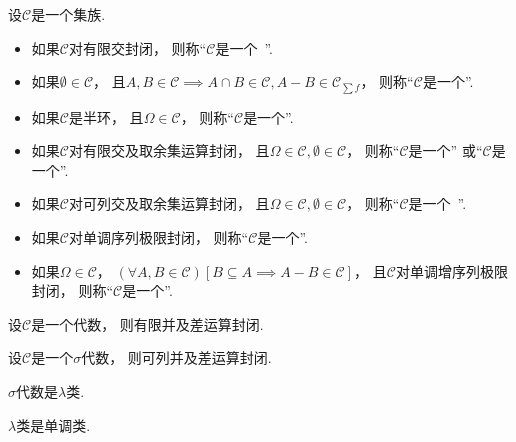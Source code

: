 \begin{definition}
设\(\mathcal{C}\)是一个集族.
\begin{itemize}
	\item 如果\(\mathcal{C}\)对有限交封闭，
	则称“\(\mathcal{C}\)是一个~”.
	\item 如果\(\emptyset\in\mathcal{C}\)，
	且\(A,B\in\mathcal{C} \implies A \cap B \in \mathcal{C}, A-B \in \mathcal{C}_{\sum f}\)，
	则称“\(\mathcal{C}\)是一个”.
	\item 如果\(\mathcal{C}\)是半环，
	且\(\Omega\in\mathcal{C}\)，
	则称“\(\mathcal{C}\)是一个”.
	\item 如果\(\mathcal{C}\)对有限交及取余集运算封闭，
	且\(\Omega\in\mathcal{C},
	\emptyset\in\mathcal{C}\)，
	则称“\(\mathcal{C}\)是一个”
	或“\(\mathcal{C}\)是一个”.
	\item 如果\(\mathcal{C}\)对可列交及取余集运算封闭，
	且\(\Omega\in\mathcal{C},
	\emptyset\in\mathcal{C}\)，
	则称“\(\mathcal{C}\)是一个~”.
	\item 如果\(\mathcal{C}\)对单调序列极限封闭，
	则称“\(\mathcal{C}\)是一个”.
	\item 如果\(\Omega\in\mathcal{C}\)，
	\((\forall A,B\in\mathcal{C})[B \subseteq A \implies A-B\in\mathcal{C}]\)，
	且\(\mathcal{C}\)对单调增序列极限封闭，
	则称“\(\mathcal{C}\)是一个”.
\end{itemize}
\end{definition}

\begin{proposition}
设\(\mathcal{C}\)是一个代数，
则有限并及差运算封闭.
\end{proposition}
\begin{proposition}
设\(\mathcal{C}\)是一个\(\sigma\)代数，
则可列并及差运算封闭.
\end{proposition}

\begin{proposition}
\(\sigma\)代数是\(\lambda\)类.
\end{proposition}
\begin{proposition}
\(\lambda\)类是单调类.
\end{proposition}

